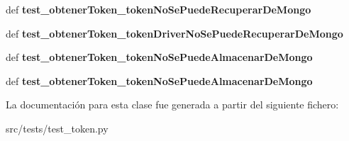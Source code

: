 \begin{DoxyCompactItemize}
\item 
\hypertarget{classsrc_1_1tests_1_1test__token_1_1_test_token_a7e76dfd60722f62319508e396a1dbb94}{def {\bfseries test\-\_\-obtener\-Token\-\_\-token\-No\-Se\-Puede\-Recuperar\-De\-Mongo}}\label{classsrc_1_1tests_1_1test__token_1_1_test_token_a7e76dfd60722f62319508e396a1dbb94}

\item 
\hypertarget{classsrc_1_1tests_1_1test__token_1_1_test_token_af211afce1386a54cb9fde8c07c0036dc}{def {\bfseries test\-\_\-obtener\-Token\-\_\-token\-Driver\-No\-Se\-Puede\-Recuperar\-De\-Mongo}}\label{classsrc_1_1tests_1_1test__token_1_1_test_token_af211afce1386a54cb9fde8c07c0036dc}

\item 
\hypertarget{classsrc_1_1tests_1_1test__token_1_1_test_token_af2ba8ac11b6495774c4a0302fe3b86ad}{def {\bfseries test\-\_\-obtener\-Token\-\_\-token\-No\-Se\-Puede\-Almacenar\-De\-Mongo}}\label{classsrc_1_1tests_1_1test__token_1_1_test_token_af2ba8ac11b6495774c4a0302fe3b86ad}

\item 
\hypertarget{classsrc_1_1tests_1_1test__token_1_1_test_token_af2ba8ac11b6495774c4a0302fe3b86ad}{def {\bfseries test\-\_\-obtener\-Token\-\_\-token\-No\-Se\-Puede\-Almacenar\-De\-Mongo}}\label{classsrc_1_1tests_1_1test__token_1_1_test_token_af2ba8ac11b6495774c4a0302fe3b86ad}

\end{DoxyCompactItemize}


La documentación para esta clase fue generada a partir del siguiente fichero\-:\begin{DoxyCompactItemize}
\item 
src/tests/test\-\_\-token.\-py\end{DoxyCompactItemize}
